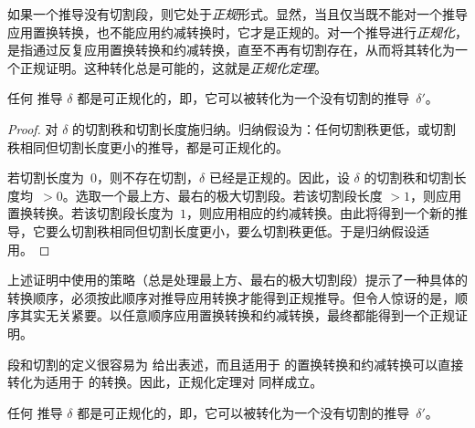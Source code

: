 \documentclass[../../../include/open-logic-section]{subfiles}
\begin{document}


如果一个推导没有切割段，则它处于\emph{正规}形式。显然，当且仅当既不能对一个推导应用置换转换，也不能应用约减转换时，它才是正规的。对一个推导进行\emph{正规化}，是指通过反复应用置换转换和约减转换，直至不再有切割存在，从而将其转化为一个正规证明。这种转化总是可能的，这就是\emph{正规化定理}。

\begin{thm} 任何  推导 $\delta$ 都是可正规化的，即，它可以被转化为一个没有切割的推导~$\delta'$。
\end{thm}

\begin{proof}
  对 $\delta$ 的切割秩和切割长度施归纳。归纳假设为：任何切割秩更低，或切割秩相同但切割长度更小的推导，都是可正规化的。

  若切割长度为~$0$，则不存在切割，$\delta$ 已经是正规的。因此，设 $\delta$ 的切割秩和切割长度均~$> 0$。选取一个最上方、最右的极大切割段。若该切割段长度 $>1$，则应用置换转换。若该切割段长度为~$1$，则应用相应的约减转换。由此将得到一个新的推导，它要么切割秩相同但切割长度更小，要么切割秩更低。于是归纳假设适用。
\end{proof}

上述证明中使用的策略（总是处理最上方、最右的极大切割段）提示了一种具体的转换顺序，必须按此顺序对推导应用转换才能得到正规推导。但令人惊讶的是，顺序其实无关紧要。以任意顺序应用置换转换和约减转换，最终都能得到一个正规证明。

段和切割的定义很容易为  给出表述，而且适用于  的置换转换和约减转换可以直接转化为适用于  的转换。因此，正规化定理对  同样成立。

\begin{thm} 任何  推导 $\delta$ 都是可正规化的，即，它可以被转化为一个没有切割的推导~$\delta'$。
\end{thm}
\end{document}
